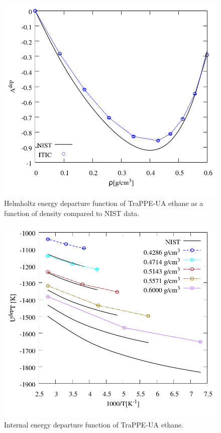 \documentclass[%
 aip,
 jcp,
 sd,%
 amsmath,amssymb,
]{revtex4-1}
\begin{document}
\begin{figure}[!htbp]
\includegraphics[scale=0.35]{Figures/EXAMPLE-SIM_TraPPE-C2_adep.png}
\caption{Helmholtz energy departure function of TraPPE-UA ethane as a function of density compared to NIST data.}
\label{fig:EXAMPLE-SIM/TraPPE-C2/adep}
\end{figure}

\begin{figure}[!htbp]
\includegraphics[scale=0.35]{Figures/EXAMPLE-SIM_TraPPE-C2_udep.png}
\caption{Internal energy departure function of TraPPE-UA ethane.}
\label{fig:EXAMPLE-SIM/TraPPE-C2/udep}
\end{figure}
\end{document}
